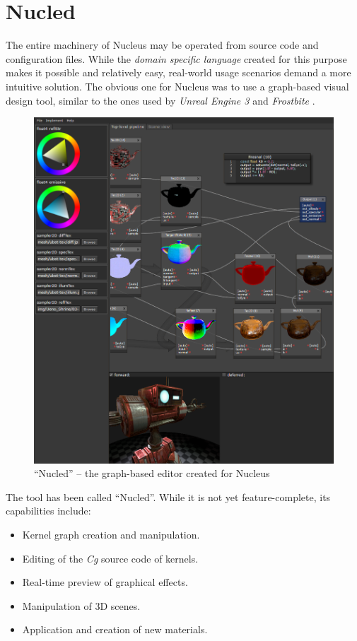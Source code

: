 
\chapter{ Nucled }
\label{Chapter5}

The entire machinery of Nucleus may be operated from source code and configuration files. While the \emph{domain specific language} created for this purpose makes it possible and relatively easy, real-world usage scenarios demand a more intuitive solution. The obvious one for Nucleus was to use a graph-based visual design tool, similar to the ones used by \emph{Unreal Engine 3} \cite{ue3MaterialEditor} and \emph{Frostbite} \cite{AT07}.

\begin{figure}[ht!]
  \centering
    \includegraphics[width=0.9\linewidth]{./Figures/Nucled.png}
    \caption[Nucled]{``Nucled'' -- the graph-based editor created for Nucleus}
  \label{fig:Nucled}
\end{figure}


The tool has been called ``Nucled''. While it is not yet feature-complete, its capabilities include:
\begin{itemize}
\item Kernel graph creation and manipulation.
\item Editing of the \emph{Cg} source code of kernels.
\item Real-time preview of graphical effects.
\item Manipulation of 3D scenes.
\item Application and creation of new materials.
\end{itemize}

